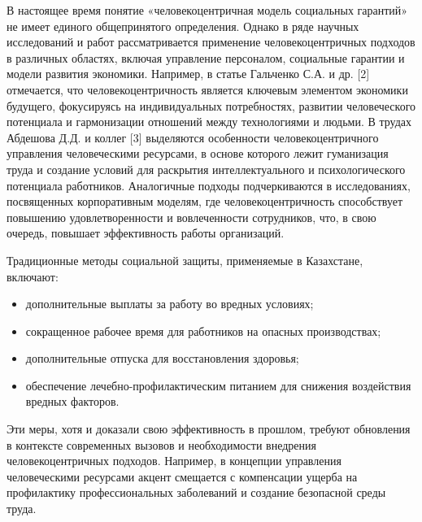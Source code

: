В настоящее время понятие «человекоцентричная модель социальных
гарантий» не имеет единого общепринятого определения. Однако в ряде
научных исследований и работ рассматривается применение
человекоцентричных подходов в различных областях, включая управление
персоналом, социальные гарантии и модели развития экономики. Например, в
статье Гальченко С.А. и др. {[}2{]} отмечается, что человекоцентричность
является ключевым элементом экономики будущего, фокусируясь на
индивидуальных потребностях, развитии человеческого потенциала и
гармонизации отношений между технологиями и людьми\hspace{0pt}. В трудах
Абдешова Д.Д. и коллег {[}3{]} выделяются особенности
человекоцентричного управления человеческими ресурсами, в основе
которого лежит гуманизация труда и создание условий для раскрытия
интеллектуального и психологического потенциала работников\hspace{0pt}.
Аналогичные подходы подчеркиваются в исследованиях, посвященных
корпоративным моделям, где человекоцентричность способствует повышению
удовлетворенности и вовлеченности сотрудников, что, в свою очередь,
повышает эффективность работы организаций\hspace{0pt}\hspace{0pt}.

Традиционные методы социальной защиты, применяемые в Казахстане,
включают:

\begin{itemize}
\item
  дополнительные выплаты за работу во вредных условиях;
\item
  сокращенное рабочее время для работников на опасных производствах;
\item
  дополнительные отпуска для восстановления здоровья;
\item
  обеспечение лечебно-профилактическим питанием для снижения воздействия
  вредных факторов\hspace{0pt}\hspace{0pt}.
\end{itemize}

Эти меры, хотя и доказали свою эффективность в прошлом, требуют
обновления в контексте современных вызовов и необходимости внедрения
человекоцентричных подходов. Например, в концепции управления
человеческими ресурсами акцент смещается с компенсации ущерба на
профилактику профессиональных заболеваний и создание безопасной среды
труда\hspace{0pt}\hspace{0pt}.

